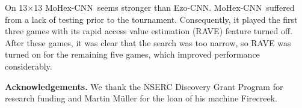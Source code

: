 \documentclass{icga}
\def\Ec{\mbox{\sc Ezo-CNN}}
\def\Mc{\mbox{\sc MoHex-CNN}}
\begin{document}
On 13$\times$13 \Mc\ seems stronger than \Ec.
\Mc\ suffered from a lack of testing prior to the tournament.
Consequently, it played the first three games with its rapid access value estimation (RAVE)
feature turned off. After these games, it was clear that the search
was too narrow, so RAVE was turned on for the remaining five games, which improved
performance considerably.

{\bf Acknowledgements.}
We thank the NSERC Discovery Grant Program for research funding and
Martin M\"{u}ller for the loan of his machine Firecreek.

\end{document}
